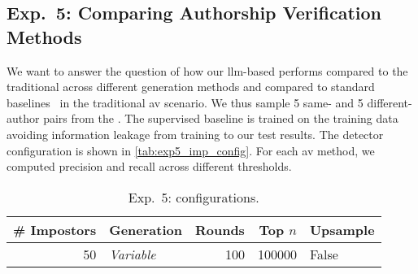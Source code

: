 \subsection{Exp.\ 5: Comparing Authorship Verification Methods}%
\label{subsec:imp_gen}

We want to answer the question of how our \ac{llm}-based \impAppr{} performs compared to the traditional \impAppr{} across different generation methods and compared to standard baselines~\citep{koppel_determining_2014} %
in the traditional \ac{av} scenario.
We thus sample 5 same- and 5 different-author pairs from the \dataStudent{}. %
The supervised baseline is trained on the training data avoiding information leakage from training to our test results.
The \impAppr{} 
detector configuration is shown in \autoref{tab:exp5_imp_config}. %
For each \ac{av} method, we computed precision and recall across different thresholds. 

\begin{table}[h]
\centering\small
\caption{Exp.\ 5: \impAppr{} configurations.}
\label{tab:exp5_imp_config}
\begin{tabular}{@{}rlrrl@{}}   %
\toprule
\# Impostors & Generation & Rounds & Top $n$ & Upsample \\
\midrule
50 & \textit{Variable} & 100 & \num{100000} & False \\
\bottomrule
\end{tabular}%
\end{table}



